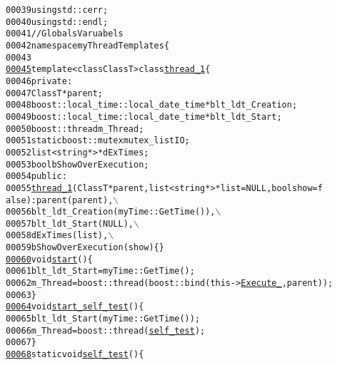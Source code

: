 \begin{footnotesize}
\begin{alltt}
00039 \textcolor{keyword}{using} std::cerr;
00040 \textcolor{keyword}{using} std::endl;
00041 \textcolor{comment}{//Globals Varuabels}
00042 \textcolor{keyword}{namespace }myThreadTemplates\{
00043 
\hypertarget{myThreadTemplates_8hpp_source_l00045}{}\hyperlink{classmyThreadTemplates_1_1thread__1}{00045} \textcolor{keyword}{template} <\textcolor{keyword}{class} ClassT> \textcolor{keyword}{class }\hyperlink{classmyThreadTemplates_1_1thread__1}{thread_1}\{
00046         \textcolor{keyword}{private}:
00047                 ClassT *parent; 
00048                 boost::local\_time::local\_date\_time *blt\_ldt\_Creation; 
00049                 boost::local\_time::local\_date\_time *blt\_ldt\_Start; 
00050                 boost::thread m\_Thread; 
00051                 \textcolor{keyword}{static} boost::mutex mutex\_listIO; 
00052                 list<string*> *dExTimes; 
00053                 \textcolor{keywordtype}{bool} bShowOverExecution; 
00054         \textcolor{keyword}{public}:
00055                 \hyperlink{classmyThreadTemplates_1_1thread__1}{thread_1}(ClassT *parent, list<string*> *list = NULL,\textcolor{keywordtype}{bool} show = \textcolor{keyword}{f
      alse}): parent(parent),\(\backslash\)
00056                 blt\_ldt\_Creation(myTime::GetTime()),\(\backslash\)
00057                 blt\_ldt\_Start(NULL),\(\backslash\)
00058                 dExTimes(list),\(\backslash\)
00059                 bShowOverExecution(show)\{\}
\hypertarget{myThreadTemplates_8hpp_source_l00060}{}\hyperlink{classmyThreadTemplates_1_1thread__1_a40dcf528dbb18b16ed44054451a575e1}{00060}                 \textcolor{keywordtype}{void} \hyperlink{classmyThreadTemplates_1_1thread__1_a40dcf528dbb18b16ed44054451a575e1}{start}()\{
00061             blt\_ldt\_Start = myTime::GetTime();
00062             m\_Thread = boost::thread (boost::bind(this->\hyperlink{classmyThreadTemplates_1_1thread__1_a24e615ac4afa0d376faefd500ed47e43}{Execute_},parent));
00063         \}
\hypertarget{myThreadTemplates_8hpp_source_l00064}{}\hyperlink{classmyThreadTemplates_1_1thread__1_aaa171242d5355f2a472a566d30863894}{00064}                 \textcolor{keywordtype}{void} \hyperlink{classmyThreadTemplates_1_1thread__1_aaa171242d5355f2a472a566d30863894}{start_self_test}()\{
00065             blt\_ldt\_Start(myTime::GetTime());
00066             m\_Thread = boost::thread (\hyperlink{classmyThreadTemplates_1_1thread__1_add97f72749590d4023fd23fcd0a3dece}{self_test});
00067         \}
\hypertarget{myThreadTemplates_8hpp_source_l00068}{}\hyperlink{classmyThreadTemplates_1_1thread__1_add97f72749590d4023fd23fcd0a3dece}{00068}                 \textcolor{keyword}{static} \textcolor{keywordtype}{void} \hyperlink{classmyThreadTemplates_1_1thread__1_add97f72749590d4023fd23fcd0a3dece}{self_test}()\{

\end{alltt}
\end{footnotesize}
